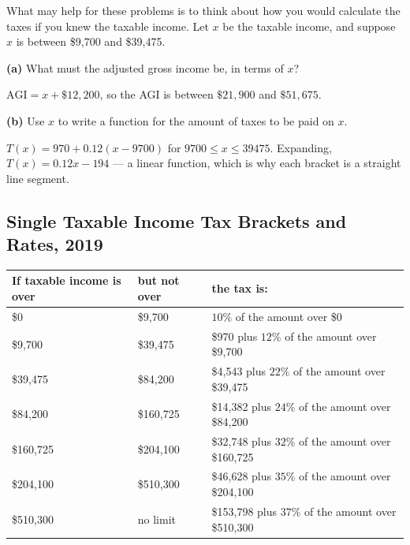 \documentclass[12pt]{ximera}
\begin{document}
\begin{problem}
What may help for these problems is to think about how you would calculate the taxes
if you knew the taxable income. Let $x$ be the taxable income, and suppose $x$ is
between \$9,700 and \$39,475.

\begin{prompt}
\textbf{(a)} What must the adjusted gross income be, in terms of $x$?
\begin{freeResponse}
\end{freeResponse}

\begin{solution}
$\text{AGI} = x + \$12{,}200$, so the AGI is between $\$21{,}900$ and $\$51{,}675$.
\end{solution}
\end{prompt}

\begin{prompt}
\textbf{(b)} Use $x$ to write a function for the amount of taxes to be paid on $x$.
\begin{freeResponse}
\end{freeResponse}

\begin{solution}
$T(x) = 970 + 0.12(x - 9700)$ for $9700 \le x \le 39475$. Expanding,
$T(x) = 0.12x - 194$ --- a linear function, which is why each bracket is a straight
line segment.
\end{solution}
\end{prompt}
\end{problem}

\subsection*{Single Taxable Income Tax Brackets and Rates, 2019}

\begin{center}
\begin{tabular}{|l|l|l|}
\hline
If taxable income is over & but not over & the tax is: \\
\hline
\$0 & \$9,700 & $10\%$ of the amount over \$0 \\
\hline
\$9,700 & \$39,475 & \$970 plus $12\%$ of the amount over \$9,700 \\
\hline
\$39,475 & \$84,200 & \$4,543 plus $22\%$ of the amount over \$39,475 \\
\hline
\$84,200 & \$160,725 & \$14,382 plus $24\%$ of the amount over \$84,200 \\
\hline
\$160,725 & \$204,100 & \$32,748 plus $32\%$ of the amount over \$160,725 \\
\hline
\$204,100 & \$510,300 & \$46,628 plus $35\%$ of the amount over \$204,100 \\
\hline
\$510,300 & no limit & \$153,798 plus $37\%$ of the amount over \$510,300 \\
\hline
\end{tabular}
\end{center}
\end{document}
